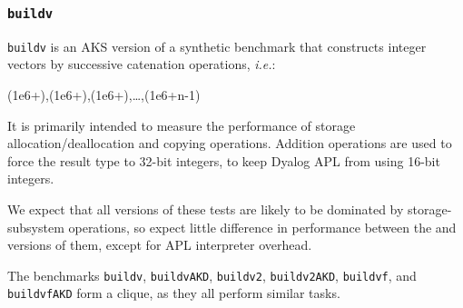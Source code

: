 \subsubsection{\tt buildv}
\label{benchmarkbuildv}

{\tt buildv} is an AKS version of a synthetic benchmark that constructs integer
vectors by successive catenation operations, {\em i.e.}:

 {\apl (1e6+\qiota{}),(1e6+\qiota{}),(1e6+\qiota{}),\dots,(1e6+\qiota\0n-1)}

\noindent It is primarily intended to measure the
performance of storage allocation/deallocation and
copying operations. Addition operations are
used to force the result type to 32-bit integers, to keep Dyalog APL
from using 16-bit integers.

We expect that all versions of these tests are likely to be dominated
by storage-subsystem operations, so expect little
difference in performance between the \dapl and \sac versions of them,
except for APL interpreter overhead.

The benchmarks {\tt buildv}, {\tt buildvAKD}, {\tt buildv2}, {\tt buildv2AKD},
{\tt buildvf}, and {\tt buildvfAKD} form a clique, as they
all perform similar tasks.

